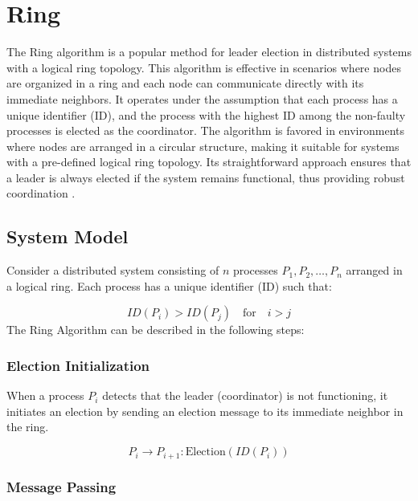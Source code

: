 \section{Ring}

The Ring algorithm is a popular method for leader election in distributed systems with a logical ring topology. This algorithm is effective in scenarios where nodes are organized in a ring and each node can communicate directly with its immediate neighbors. It operates under the assumption that each process has a unique identifier (ID), and the process with the highest ID among the non-faulty processes is elected as the coordinator. The algorithm is favored in environments where nodes are arranged in a circular structure, making it suitable for systems with a pre-defined logical ring topology. Its straightforward approach ensures that a leader is always elected if the system remains functional, thus providing robust coordination \cite{Ref10}.

\subsection{System Model}
Consider a distributed system consisting of \(n\) processes \(P_1, P_2, \ldots, P_n\) arranged in a logical ring. Each process has a unique identifier (ID) such that:

\[
ID(P_i) > ID(P_j) \quad \text{for} \quad i > j
\]
The Ring Algorithm can be described in the following steps:

\subsubsection{Election Initialization}

When a process \(P_i\) detects that the leader (coordinator) is not functioning, it initiates an election by sending an election message to its immediate neighbor in the ring.

\begin{equation}
P_i \rightarrow P_{i+1}: \text{Election}(ID(P_i))
\end{equation}

\subsubsection{Message Passing}

